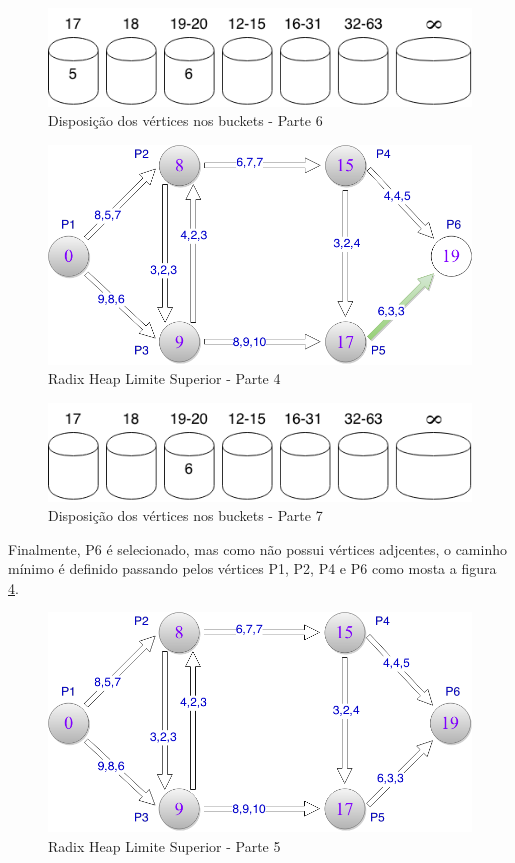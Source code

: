 \begin{figure}[htbp]
\centering
 \includegraphics[width=.50\textwidth]{chapters/fig/buckets6.png}
\caption{Disposição dos vértices nos buckets - Parte 6}
\label{fig:buckets6}
\end{figure}

\begin{figure}[htbp]
\centering
 \includegraphics[width=.50\textwidth]{chapters/fig/limitesup4.png}
\caption{Radix Heap Limite Superior - Parte 4}
\label{fig:limitesup4}
\end{figure}

\begin{figure}[htbp]
\centering
 \includegraphics[width=.50\textwidth]{chapters/fig/buckets7.png}
\caption{Disposição dos vértices nos buckets - Parte 7}
\label{fig:buckets7}
\end{figure}
\FloatBarrier

Finalmente, P6 é selecionado, mas como não possui vértices adjcentes, o caminho mínimo é definido passando
pelos vértices P1, P2, P4 e P6 como mosta a figura \ref{fig:limitesup5}.

\begin{figure}[htbp]
\centering
 \includegraphics[width=.50\textwidth]{chapters/fig/limitesup5.png}
\caption{Radix Heap Limite Superior - Parte 5}
\label{fig:limitesup5}
\end{figure}
\FloatBarrier

